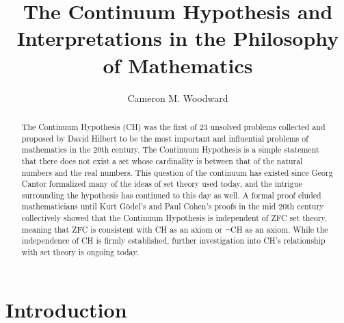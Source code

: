 \documentclass[10pt,letterpaper]{amsart}
\numberwithin{equation}{section}
\theoremstyle{plain}
\theoremstyle{definition}
\numberwithin{equation}{section}
\begin{document}
\pagestyle{plain}


\title{The Continuum Hypothesis and Interpretations in the Philosophy of Mathematics}
\author{Cameron M. Woodward}

\begin{abstract}
The Continuum Hypothesis (CH) was the first of 23 unsolved problems collected and proposed by David Hilbert to be the most important and influential problems of mathematics in the 20th century. The Continuum Hypothesis is a simple statement that there does not exist a set whose cardinality is between that of the natural numbers and the real numbers. This question of the continuum has existed since Georg Cantor formalized many of the ideas of set theory used today, and the intrigue surrounding the hypothesis has continued to this day as well. A formal proof eluded mathematicians until Kurt Gödel's and Paul Cohen’s proofs in the mid 20th century collectively showed that the Continuum Hypothesis is independent of ZFC set theory, meaning that ZFC is consistent with CH as an axiom or $\neg$CH as an axiom. While the independence of CH is firmly established, further investigation into CH's relationship with set theory is ongoing today.
\end{abstract}

\maketitle


\section{Introduction}
\end{document}
